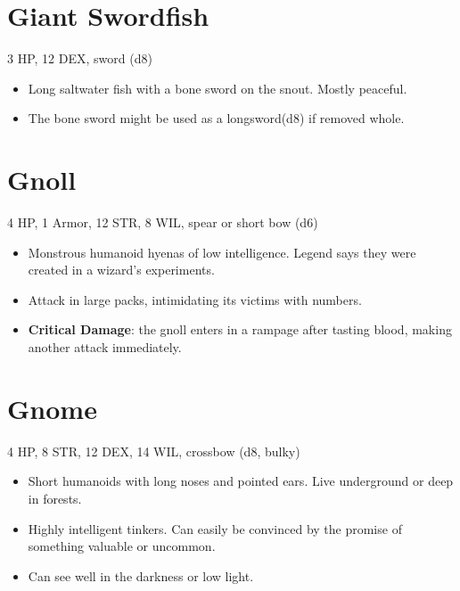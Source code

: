 \documentclass[
  10pt,
  american,
]{article}
\begin{document}
\hypertarget{giant-swordfish}{%
\section{Giant Swordfish}\label{giant-swordfish}}

3 HP, 12 DEX, sword (d8)

\begin{samepage}
\begin{itemize}
\setlength\itemsep{-.5em}
\item Long saltwater fish with a bone sword on the snout. Mostly peaceful.
\item The bone sword might be used as a longsword(d8) if removed whole.
\end{itemize}
\end{samepage}

\hypertarget{gnoll}{%
\section{Gnoll}\label{gnoll}}

4 HP, 1 Armor, 12 STR, 8 WIL, spear or short bow (d6)

\begin{samepage}
\begin{itemize}
\setlength\itemsep{-.5em}
\item Monstrous humanoid hyenas of low intelligence.   Legend says they were created in a wizard’s experiments.
\item Attack in large packs, intimidating its victims with numbers.
\item \textbf{Critical Damage}: the gnoll enters in a rampage after tasting blood, making another attack immediately.
\end{itemize}
\end{samepage}

\hypertarget{gnome}{%
\section{Gnome}\label{gnome}}

4 HP, 8 STR, 12 DEX, 14 WIL, crossbow (d8, bulky)

\begin{samepage}
\begin{itemize}
\setlength\itemsep{-.5em}
\item Short humanoids with long noses and pointed ears.   Live underground or deep in forests.
\item Highly intelligent tinkers.   Can easily be convinced by the promise of something valuable or uncommon.
\item Can see well in the darkness or low light.
\end{itemize}
\end{samepage}
\end{document}
